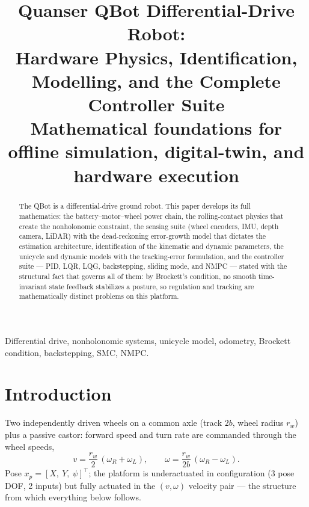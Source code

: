 \documentclass[conference]{IEEEtran}
\begin{document}
\title{Quanser QBot Differential-Drive Robot:\\ Hardware Physics, Identification, Modelling, and the Complete Controller Suite\\
{\footnotesize Mathematical foundations for offline simulation, digital-twin, and hardware execution}}

\author{
}

\maketitle

\begin{abstract}
The QBot is a differential-drive ground robot. This paper develops its full mathematics: the battery--motor--wheel power chain, the rolling-contact physics that create the nonholonomic constraint, the sensing suite (wheel encoders, IMU, depth camera, LiDAR) with the dead-reckoning error-growth model that dictates the estimation architecture, identification of the kinematic and dynamic parameters, the unicycle and dynamic models with the tracking-error formulation, and the controller suite --- PID, LQR, LQG, backstepping, sliding mode, and NMPC --- stated with the structural fact that governs all of them: by Brockett's condition, no smooth time-invariant state feedback stabilizes a posture, so regulation and tracking are mathematically distinct problems on this platform.
\end{abstract}

\begin{IEEEkeywords}
Differential drive, nonholonomic systems, unicycle model, odometry, Brockett condition, backstepping, SMC, NMPC.
\end{IEEEkeywords}

\section{Introduction}
Two independently driven wheels on a common axle (track $2b$, wheel radius $r_w$) plus a passive castor: forward speed and turn rate are commanded through the wheel speeds,
\begin{equation}
v = \frac{r_w}{2}\,(\omega_R + \omega_L),\qquad
\omega = \frac{r_w}{2b}\,(\omega_R - \omega_L).
\label{eq:diffmap}
\end{equation}
Pose $x_p = [X,\ Y,\ \psi]^{\!\top}$; the platform is underactuated in configuration (3 pose DOF, 2 inputs) but fully actuated in the $(v,\omega)$ velocity pair --- the structure from which everything below follows.
\end{document}
